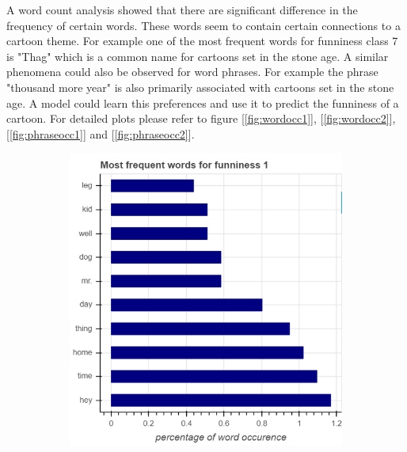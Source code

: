 \documentclass[draft,final,oneside]{vutinfth} %
\begin{document}
A word count analysis showed that there are significant difference in the frequency of certain words. These words seem to contain certain connections to a cartoon theme. For example one of the most frequent words for funniness class 7 is "Thag" which is a common name for cartoons set in the stone age. A similar phenomena could also be observed for word phrases. For example the phrase "thousand more year" is also primarily associated with cartoons set in the stone age. A model could learn this preferences and use it to predict the funniness of a cartoon. For detailed plots please refer to figure [\ref{fig:wordocc1}], [\ref{fig:wordocc2}], [\ref{fig:phraseocc1}] and [\ref{fig:phraseocc2}].

\begin{figure}
\centering

\begin{subfigure}[b]{0.45\textwidth}
\centering
\includegraphics[width=1.0\textwidth]{graphics/word_occurence/funniness_1}
\end{subfigure}\quad
\begin{subfigure}[b]{0.45\textwidth}
\centering

\end{subfigure}
\end{figure}
\end{document}
